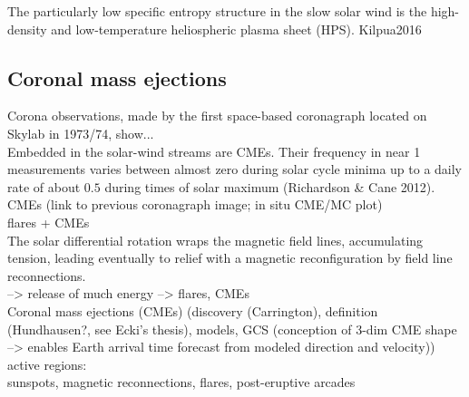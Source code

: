 The particularly low specific entropy structure in the slow solar wind is the high-density and low-temperature heliospheric plasma sheet (HPS). Kilpua2016\\



\subsection{Coronal mass ejections}
\label{sec:coronal_mass_ejections}

Corona observations, made by the first space-based coronagraph located on Skylab in 1973/74, show...\\

Embedded in the solar-wind streams are CMEs. Their frequency in near \SI{1}{\au} measurements varies between almost zero during solar cycle minima up to a daily rate of about $0.5$ during times of solar maximum (Richardson \& Cane 2012).\\


CMEs (link to previous coronagraph image; in situ CME/MC plot)\\

flares + CMEs\\

The solar differential rotation wraps the magnetic field lines, accumulating tension, leading eventually to relief with a magnetic reconfiguration by field line reconnections.\\
--> release of much energy --> flares, CMEs\\


Coronal mass ejections (CMEs) (discovery (Carrington), definition (Hundhausen?, see Ecki's thesis), models, GCS (conception of 3-dim CME shape --> enables Earth arrival time forecast from modeled direction and velocity))\\

active regions:\\
sunspots, magnetic reconnections, flares, post-eruptive arcades\\

